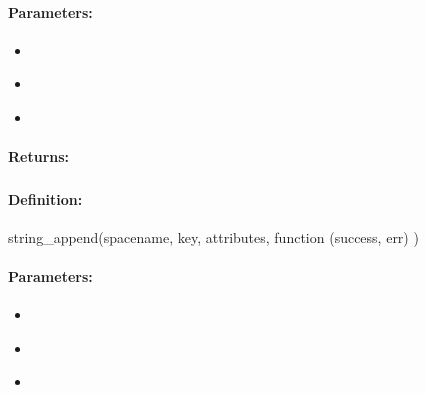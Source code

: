 \paragraph{Parameters:}
\begin{itemize}[noitemsep]
\item {}\\

\item {}\\

\item {}\\

\end{itemize}

\paragraph{Returns:}


\pagebreak
\subsubsection{}
\label{api:nodejs:string_append}


\paragraph{Definition:}
\begin{javascriptcode}
string_append(spacename, key, attributes, function (success, err) {})
\end{javascriptcode}
\paragraph{Parameters:}
\begin{itemize}[noitemsep]
\item {}\\

\item {}\\

\item {}\\

\end{itemize}

